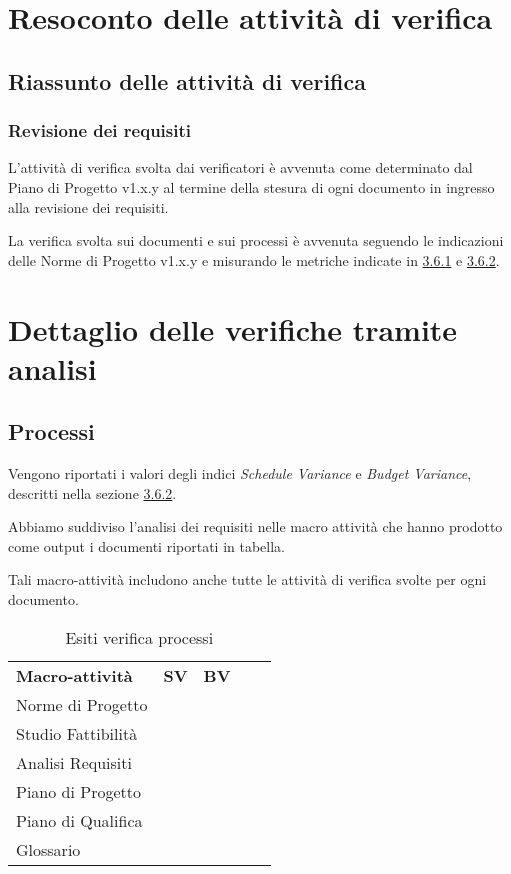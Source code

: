 \newpage
\appendix
\section{Resoconto delle attività di verifica} \label{App:AppendixA}
	\subsection{Riassunto delle attività di verifica} \label{App:AppendixA}
		\subsubsection{Revisione dei requisiti} \label{App:AppendixA}
			
			L'attività di verifica svolta dai verificatori è avvenuta come determinato dal Piano di Progetto v1.x.y al termine della stesura di ogni documento in ingresso alla revisione dei requisiti.
			
			La verifica svolta sui documenti e sui processi è avvenuta seguendo le indicazioni delle Norme di Progetto v1.x.y e misurando le metriche indicate in \hyperlink{metriche_documenti}{3.6.1} e \hyperlink{metriche_processi}{3.6.2}.
			
\section{Dettaglio delle verifiche tramite analisi} \label{App:AppendixB}
	\subsection{Processi} \label{App:AppendixB}
	
		Vengono riportati i valori degli indici \textit{Schedule Variance} e \textit{Budget Variance}, descritti nella sezione \hyperlink{metriche_processi}{3.6.2}.
		
		Abbiamo suddiviso l'analisi dei requisiti nelle macro attività che hanno prodotto come output i documenti riportati in tabella. 
		
		Tali macro-attività includono anche tutte le attività di verifica svolte per ogni documento.
		
		\begin{table}[!ht]
			\centering
				\begin{tabular}{|l|l|l|ll}
					\cline{1-3}
					 \textbf{Macro-attività}  & \textbf{SV}  & \textbf{BV}  &  \\ \cline{1-3}
					 Norme di Progetto  &  &  &  \\ \cline{1-3}
					 Studio Fattibilità &  &  &  \\ \cline{1-3}
					 Analisi Requisiti &  &  &  \\ \cline{1-3}
					 Piano di Progetto &  &  &  \\ \cline{1-3}
					 Piano di Qualifica &  &  &  \\ \cline{1-3}
					 Glossario &  &  &  \\ \cline{1-3}
				\end{tabular}
				\caption{Esiti verifica processi}
		\end{table}
		

